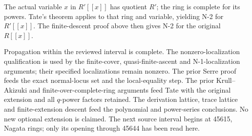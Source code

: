 The actual variable \(x\) in \(R'[[x]]\) has quotient \(R'\); the ring is complete for its powers. Tate's theorem applies to that ring and variable, yielding N-2 for \(R'[[x]]\). The finite-descent proof above then gives N-2 for the original \(R[[x]]\).

Propagation within the reviewed interval is complete. The nonzero-localization qualification is used by the finite-cover, quasi-finite-ascent and N-1-localization arguments; their specified localizations remain nonzero. The prior Serre proof feeds the exact normal-locus set and the local-equality step. The prior Krull--Akizuki and finite-over-complete-ring arguments feed Tate with the original extension and all \(q\)-power factors retained. The derivation lattice, trace lattice and finite-extension descent feed the polynomial and power-series conclusions. No new optional extension is claimed. The next source interval begins at 45615, Nagata rings; only its opening through 45644 has been read here.
